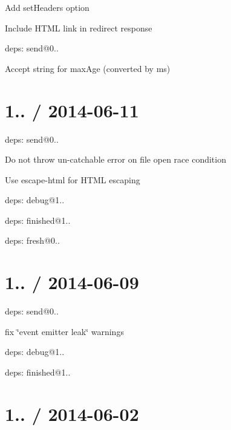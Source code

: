 \begin{DoxyItemize}
\item Add {\ttfamily set\+Headers} option
\item Include H\+T\+ML link in redirect response
\item deps\+: send@0..
\begin{DoxyItemize}
\item Accept string for {\ttfamily max\+Age} (converted by {\ttfamily ms})
\end{DoxyItemize}
\end{DoxyItemize}

\section*{1.. / 2014-\/06-\/11 }


\begin{DoxyItemize}
\item deps\+: send@0..
\begin{DoxyItemize}
\item Do not throw un-\/catchable error on file open race condition
\item Use {\ttfamily escape-\/html} for H\+T\+ML escaping
\item deps\+: debug@1..
\item deps\+: finished@1..
\item deps\+: fresh@0..
\end{DoxyItemize}
\end{DoxyItemize}

\section*{1.. / 2014-\/06-\/09 }


\begin{DoxyItemize}
\item deps\+: send@0..
\begin{DoxyItemize}
\item fix \char`\"{}event emitter leak\char`\"{} warnings
\item deps\+: debug@1..
\item deps\+: finished@1..
\end{DoxyItemize}
\end{DoxyItemize}

\section*{1.. / 2014-\/06-\/02 }


